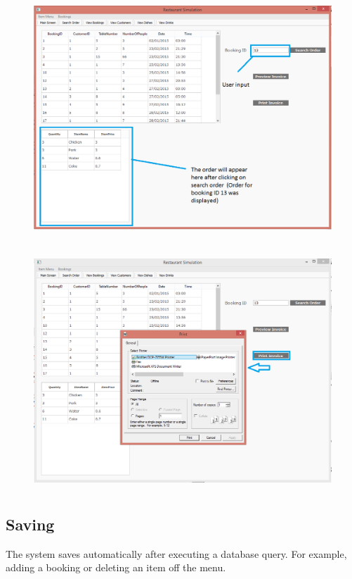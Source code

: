 \begin{figure}[H]
    \includegraphics[height = 9cm]{./Manual/images/PrintInvoice3} 
    \caption{} \label{fig:printinvoice3}
\end{figure}

\begin{figure}[H]
    \includegraphics[height = 9cm]{./Manual/images/PrintInvoice4} 
    \caption{} \label{fig:printinvoice4}
\end{figure}






\subsection{Saving}

The system saves automatically after executing a database query. For example, adding a booking or deleting an item off the menu.

